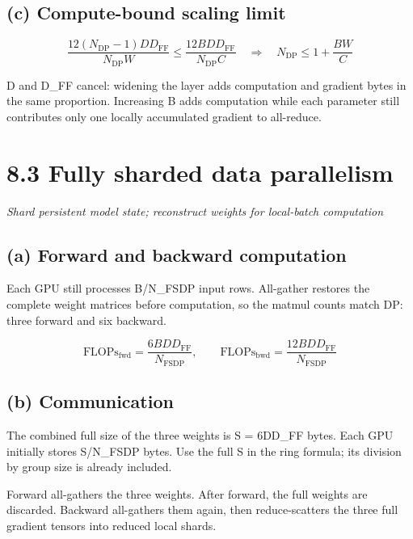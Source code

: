 \documentclass[10pt,a4paper]{article}
\begin{document}
\subsection*{(c) Compute-bound scaling limit}

\[\boxed{\frac{12(N_{\mathrm{DP}}-1)DD_{\mathrm{FF}}}{N_{\mathrm{DP}}W}\leq\frac{12BDD_{\mathrm{FF}}}{N_{\mathrm{DP}}C}\quad\Longrightarrow\quad N_{\mathrm{DP}}\leq 1+\frac{BW}{C}}\]

D and D\_FF cancel: widening the layer adds computation and gradient bytes in the same proportion. Increasing B adds computation while each parameter still contributes only one locally accumulated gradient to all-reduce.\par

\clearpage

\section*{8.3 \textperiodcentered{} Fully sharded data parallelism}

\textit{Shard persistent model state; reconstruct weights for local-batch computation}\par

\subsection*{(a) Forward and backward computation}

Each GPU still processes B/N\_FSDP input rows. All-gather restores the complete weight matrices before computation, so the matmul counts match DP: three forward and six backward.\par

\[\boxed{\mathrm{FLOPs}_{\mathrm{fwd}}=\frac{6BDD_{\mathrm{FF}}}{N_{\mathrm{FSDP}}},\qquad \mathrm{FLOPs}_{\mathrm{bwd}}=\frac{12BDD_{\mathrm{FF}}}{N_{\mathrm{FSDP}}}}\]

\subsection*{(b) Communication}

The combined full size of the three weights is S = 6DD\_FF bytes. Each GPU initially stores S/N\_FSDP bytes. Use the full S in the ring formula; its division by group size is already included.\par

Forward all-gathers the three weights. After forward, the full weights are discarded. Backward all-gathers them again, then reduce-scatters the three full gradient tensors into reduced local shards.\par
\end{document}
